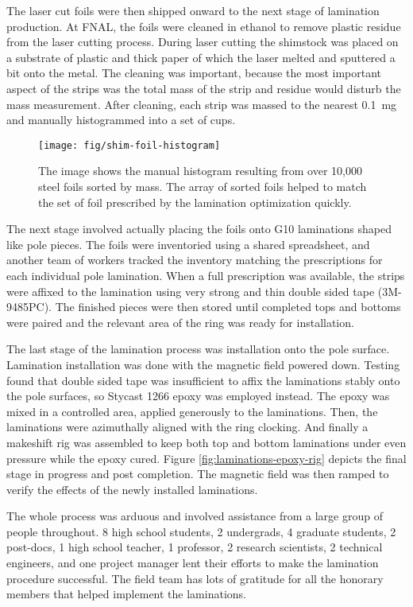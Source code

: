 The laser cut foils were then shipped onward to the next stage of lamination production.  At FNAL, the foils were cleaned in ethanol to remove plastic residue from the laser cutting process.  During laser cutting the shimstock was placed on a substrate of plastic and thick paper of which the laser melted and sputtered a bit onto the metal.  The cleaning was important, because the most important aspect of the strips was the total mass of the strip and residue would disturb the mass measurement.  After cleaning, each strip was massed to the nearest \SI{0.1}{\milli\gram} and manually histogrammed into a set of cups.

\begin{figure}
\centering
\texttt{[image: fig/shim-foil-histogram]}
\caption{
    The image shows the manual histogram resulting from over 10,000 steel foils sorted by mass.  The array of sorted foils helped to match the set of foil prescribed by the lamination optimization quickly.
    \label{fig:shim-foil-histogram}
}
\end{figure}

The next stage involved actually placing the foils onto G10 laminations shaped like pole pieces.  The foils were inventoried using a shared spreadsheet, and another team of workers tracked the inventory matching the prescriptions for each individual pole lamination.  When a full prescription was available, the strips were affixed to the lamination using very strong and thin double sided tape (3M-9485PC).  The finished pieces were then stored until completed tops and bottoms were paired and the relevant area of the ring was ready for installation.

The last stage of the lamination process was installation onto the pole surface.  Lamination installation was done with the magnetic field powered down.  Testing found that double sided tape was insufficient to affix the laminations stably onto the pole surfaces, so Stycast 1266 epoxy was employed instead.  The epoxy was mixed in a controlled area, applied generously to the laminations. Then, the laminations were azimuthally aligned with the ring clocking.  And finally a makeshift rig was assembled to keep both top and bottom laminations under even pressure while the epoxy cured.  Figure \ref{fig:laminations-epoxy-rig} depicts the final stage in progress and post completion.  The magnetic field was then ramped to verify the effects of the newly installed laminations.

The whole process was arduous and involved assistance from a large group of people throughout.  8 high school students, 2 undergrads, 4 graduate students, 2 post-docs, 1 high school teacher, 1 professor, 2 research scientists, 2 technical engineers, and one project manager lent their efforts to make the lamination procedure successful.  The field team has lots of gratitude for all the honorary members that helped implement the laminations.

